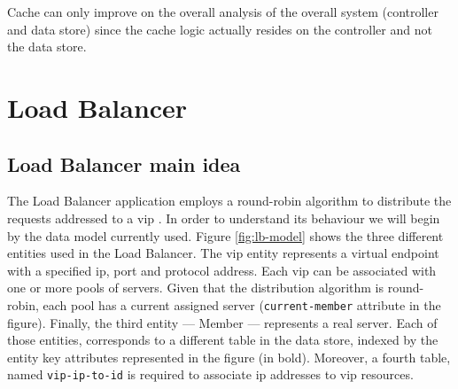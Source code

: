 Cache can only improve on the overall analysis of the overall system
(controller and data store) since the cache logic actually resides on the
controller and not the data store.




\section{Load Balancer}
\label{sec:feasibility:lb}
\glsresetall

\subsection{Load Balancer main idea} 
The Load Balancer application employs a round-robin algorithm to distribute the
requests addressed to a \gls{vip} . 
In order to understand its behaviour we will begin by the data model currently used. Figure
\ref{fig:lb-model} shows the three different entities used in the Load
Balancer. The \gls{vip} entity represents a virtual endpoint with a specified \gls{ip}, port and
protocol address. Each \gls{vip} can be associated with one or more pools of 
servers. Given that the distribution algorithm is round-robin, each pool
has a current assigned server (\texttt{current-member} attribute in the figure). Finally, the third entity --- Member
--- represents a real server. 
Each of those entities, corresponds
to a different  table  in the data store, indexed by the entity
key attributes represented in the figure (in bold). Moreover, a fourth
table, named \texttt{vip-ip-to-id} is required to associate \gls{ip} addresses to \gls{vip} resources. 



